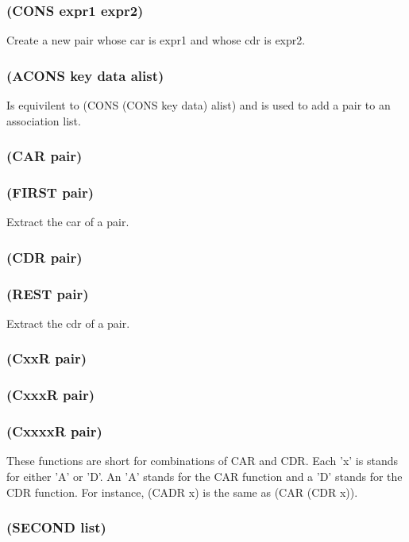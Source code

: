 \documentclass[11pt]{article}
\begin{document}
\subsubsection{(CONS expr1 expr2)}
\label{sec-4-13-1}

Create a new pair whose car is expr1 and whose cdr is expr2.
\subsubsection{(ACONS key data alist)}
\label{sec-4-13-2}

Is equivilent to (CONS (CONS key data) alist) and is used to add a
pair to an association list.
\subsubsection{(CAR pair)}
\label{sec-4-13-3}
\subsubsection{(FIRST pair)}
\label{sec-4-13-4}

Extract the car of a pair.
\subsubsection{(CDR pair)}
\label{sec-4-13-5}
\subsubsection{(REST pair)}
\label{sec-4-13-6}

Extract the cdr of a pair.
\subsubsection{(CxxR pair)}
\label{sec-4-13-7}
\subsubsection{(CxxxR pair)}
\label{sec-4-13-8}
\subsubsection{(CxxxxR pair)}
\label{sec-4-13-9}

These functions are short for combinations of CAR and CDR.  Each 'x'
is stands for either 'A' or 'D'.  An 'A' stands for the CAR function
and a 'D' stands for the CDR function.  For instance, (CADR x) is the
same as (CAR (CDR x)).
\subsubsection{(SECOND list)}
\label{sec-4-13-10}
\end{document}
